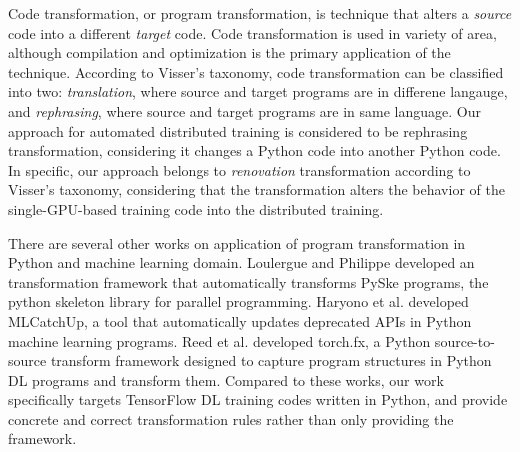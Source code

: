 Code transformation, or program transformation,
is technique that alters a \textit{source} code
into a different \textit{target} code. 
Code transformation is used in variety of area, although
compilation and optimization is the primary application of
the technique.
According to Visser\cite{Visser2001}'s taxonomy, 
code transformation can be classified into two: \textit{translation},
where source and target programs are in differene langauge,
and \textit{rephrasing}, where source and target programs are in
same language.
Our approach for automated distributed training is considered to be
rephrasing transformation, considering it changes a Python code
into another Python code. 
In specific, our approach belongs to \textit{renovation} transformation
according to Visser's taxonomy, considering that
the transformation alters the behavior of the single-GPU-based
training code into the distributed training.

There are several other works on application of program transformation
in Python and machine learning domain.
Loulergue and Philippe\cite{Loulergue2020} developed an
transformation framework that automatically transforms PySke programs, 
the python skeleton library for parallel programming.
Haryono et al. \cite{mlcatchup} developed MLCatchUp,
a tool that automatically updates deprecated APIs in Python machine learning
programs. Reed et al. \cite{torchfx} developed torch.fx,
a Python source-to-source transform framework designed to capture
program structures in Python DL programs and transform them. 
Compared to these works, our work specifically targets
TensorFlow DL training codes written in Python,
and provide concrete and correct transformation rules rather than
only providing the framework.
